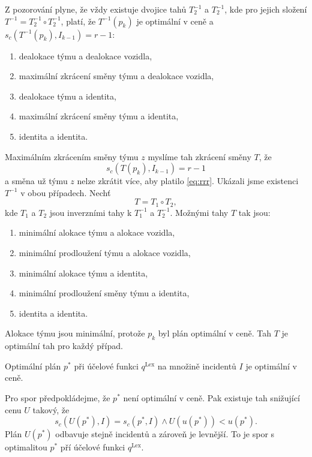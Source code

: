 \begin{dukaz}
  Z pozorování plyne, že vždy existuje dvojice tahů $T_2^{-1}$ a $T_2^{-1}$, kde pro jejich složení $T^{-1} = T_2^{-1} \circ T_2^{-1}$,
  platí, že $T^{-1}(p_k)$ je optimální v ceně a $s_c(T^{-1}(p_k), I_{k-1}) = r - 1$:
  \begin{enumerate}
  \item
    dealokace týmu a dealokace vozidla, 
  \item
    maximální zkrácení směny týmu a dealokace vozidla,
  \item
    dealokace týmu a identita,
  \item
    maximální zkrácení směny týmu a identita,
  \item
    identita a identita.
  \end{enumerate}
  Maximálním zkrácením směny týmu $z$ myslíme tah zkrácení směny $T$, že
  \begin{equation}\label{eq:rrr}
    s_c(T(p_k), I_{k-1}) = r - 1
  \end{equation}
  a směna už týmu $z$ nelze zkrátit více, aby platilo \ref{eq:rrr}.
  Ukázali jsme existenci $T^{-1}$ v obou případech. Nechť
  \begin{equation*}
    T = T_1 \circ T_2,
  \end{equation*}
  kde $T_1$ a $T_2$ jsou inverzními tahy k $T_1^{-1}$ a $T_2^{-1}$.
  Možnými tahy $T$ tak jsou:
  \begin{enumerate}
  \item
    minimální alokace týmu a alokace vozidla, 
  \item
    minimální prodloužení týmu a alokace vozidla,
  \item
    minimální alokace týmu a identita,
  \item
    minimální prodloužení směny týmu a identita,
  \item
    identita a identita.
  \end{enumerate}

  Alokace týmu jsou minimální, protože $p_k$ byl plán optimální v ceně.
  Tah $T$ je optimální tah pro každý případ.
\end{dukaz}

\begin{veta}\label{veta:lexJeOptVCene}
  Optimální plán $p^*$ při účelové funkci $q^{\text{Lex}}$ na množině incidentů $I$ je optimální v ceně.
\end{veta}
\begin{dukaz}
  Pro spor předpokládejme, že $p^*$ není optimální v ceně.
  Pak existuje tah snižující cenu $U$ takový, že
  \begin{equation*}
    s_c(U(p^*), I) = s_c(p^*, I) \land U(u(p^*)) < u(p^*).
  \end{equation*}
  Plán $U(p^*)$ odbavuje stejně incidentů a zároveň je levnější.
  To je spor s optimalitou $p^*$ pří účelové funkci $q^{\text{Lex}}$.
\end{dukaz}

